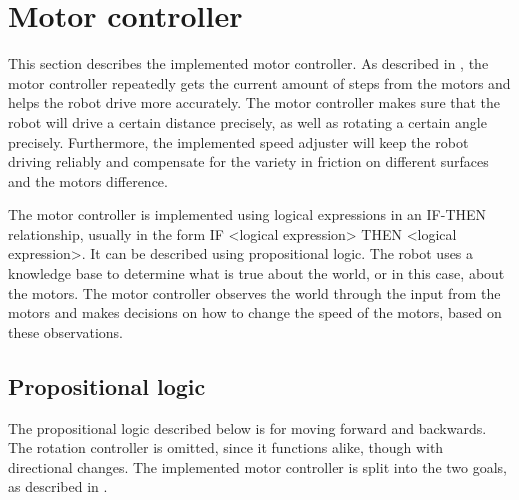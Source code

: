 \section{Motor controller} \label{sec:motor-controller-imp} 
This section describes the implemented motor controller. As described in , the motor controller repeatedly gets the current amount of steps from the motors and helps the robot drive more accurately. The motor controller makes sure that the robot will drive a certain distance precisely, as well as rotating a certain angle precisely. Furthermore, the implemented speed adjuster will keep the robot driving reliably and compensate for the variety in friction on different surfaces and the motors difference.

The motor controller is implemented using logical expressions in an IF-THEN relationship, usually in the form IF <logical expression> THEN <logical expression>. It can be described using propositional logic. The robot uses a knowledge base to determine what is true about the world, or in this case, about the motors. The motor controller observes the world through the input from the motors and makes decisions on how to change the speed of the motors, based on these observations.

\subsection{Propositional logic}
The propositional logic described below is for moving forward and backwards. The rotation controller is omitted, since it functions alike, though with directional changes. The implemented motor controller is split into the two goals, as described in . 

